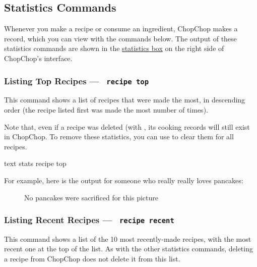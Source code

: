 
\pagebreak
\hypertarget{GroupStatsCommands}{}
\subsection{Statistics Commands}

Whenever you make a recipe or consume an ingredient, ChopChop makes a record, which you can view with the commands below.
The output of these statistics commands are shown in the \hyperlink{StatisticsBox}{statistics box} on the right side of
ChopChop's interface.


\hypertarget{StatsRecipeTopCommand}{}
\subsubsection{Listing Top Recipes — \texttt{ recipe top}}

	This command shows a list of recipes that were made the most, in descending order (the recipe listed first was made the most
	number of times).

	Note that, even if a recipe was deleted (with \hyperlink{DeleteRecipeCommand}{}, its cooking records will still
	exist in ChopChop. To remove these statistics, you can use \hyperlink{StatsRecipeClearCommand}{} to clear
	them for all recipes.

	 \begin{blockofcode}{text}
		stats recipe top
	\end{blockofcode}

	For example, here is the output for someone who really really loves pancakes:

	\begin{figure}[!htbp]\centering
		\caption{No pancakes were sacrificed for this picture}
	\end{figure}






\pagebreak
\hypertarget{StatsRecipeRecentCommand}{}
\subsubsection{Listing Recent Recipes — \texttt{ recipe recent}}

	This command shows a list of the 10 most recently-made recipes, with the most recent one at the top of the list. As with the other
	statistics commands, deleting a recipe from ChopChop does not delete it from this list.

